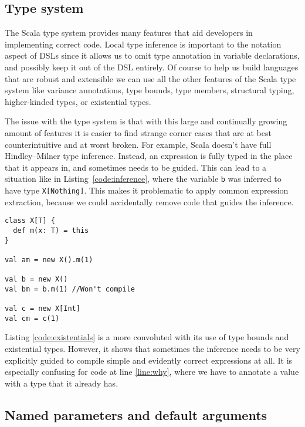 \subsection{Type system}

The Scala type system provides many features that aid developers in implementing correct code.
Local type inference is important to the notation aspect of DSLs since it allows us to omit type annotation in variable declarations, and possibly keep it out of the DSL entirely.
Of course to help us build languages that are robust and extensible we can use all the other features of the Scala type system like variance annotations, type bounds, type members, structural typing, higher-kinded types, or existential types.

The issue with the type system is that with this large and continually growing amount of features it is easier to find strange corner cases that are at best counterintuitive and at worst broken.
For example, Scala doesn't have full Hindley–Milner type inference.
Instead, an expression is fully typed in the place that it appears in, and sometimes needs to be guided.
This can lead to a situation like in Listing~\ref{code:inference}, where the variable \texttt{b} was inferred to have type \texttt{X[Nothing]}.
This makes it problematic to apply common expression extraction, because we could accidentally remove code that guides the inference.

\begin{lstlisting}[caption=Local inference, label=code:inference, float]
class X[T] {
  def m(x: T) = this
}

val am = new X().m(1)

val b = new X()
val bm = b.m(1) //Won't compile

val c = new X[Int]
val cm = c(1)
\end{lstlisting}

Listing \ref{code:existentials} is a more convoluted with its use of type bounds and existential types.
However, it shows that sometimes the inference needs to be very explicitly guided to compile simple and evidently correct expressions at all.
It is especially confusing for code at line \ref{line:why}, where we have to annotate a value with a type that it already has.

\subsection{Named parameters and default arguments}

